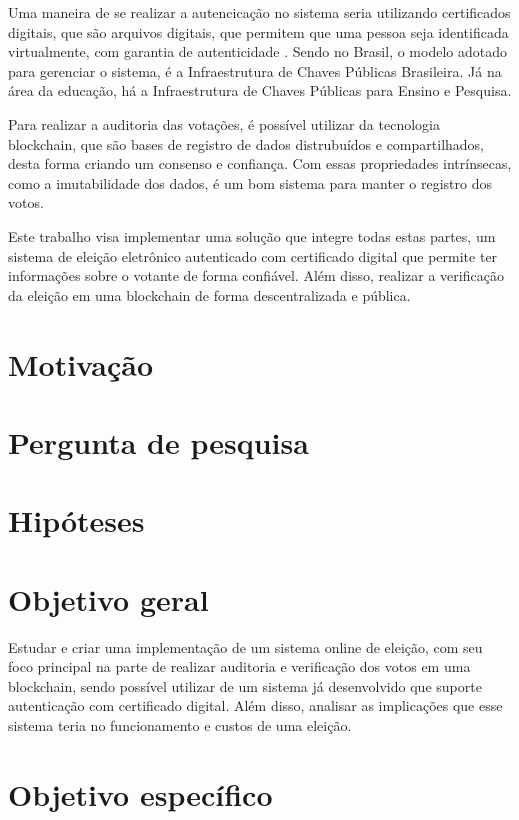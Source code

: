 \documentclass{ufsctex/ufsctex}
\begin{document}
Uma maneira de se realizar a autencicação no sistema seria utilizando certificados
digitais, que são arquivos digitais, que permitem que uma pessoa seja identificada
virtualmente, com garantia de autenticidade \cite{pki}. Sendo no Brasil, o modelo adotado para
gerenciar o sistema, é a Infraestrutura de Chaves Públicas Brasileira. Já na área
da educação, há a Infraestrutura de Chaves Públicas para Ensino e Pesquisa.

Para realizar a auditoria das votações, é possível utilizar da tecnologia
blockchain, que são bases de registro de dados distrubuídos e compartilhados,
desta forma criando um consenso e confiança. \cite{nakamoto2012bitcoin} Com essas
propriedades intrínsecas, como a imutabilidade dos dados, é um bom sistema para 
manter o registro dos votos.

Este trabalho visa implementar uma solução que integre todas estas partes, um sistema
de eleição eletrônico autenticado com certificado digital que permite ter informações
sobre o votante de forma confiável. Além disso, realizar a verificação da eleição em 
uma blockchain de forma descentralizada e pública.

\section{Motivação}

\section{Pergunta de pesquisa}

\section{Hipóteses}

\section{Objetivo geral}

Estudar e criar uma implementação de um sistema
online de eleição, com seu foco principal na parte de realizar auditoria e
verificação dos votos em uma blockchain, sendo possível utilizar de um sistema
já desenvolvido que suporte autenticação com certificado digital. Além disso,
analisar as implicações que esse sistema teria no funcionamento e custos de
uma eleição. \\

\section{Objetivo específico}
\end{document}
